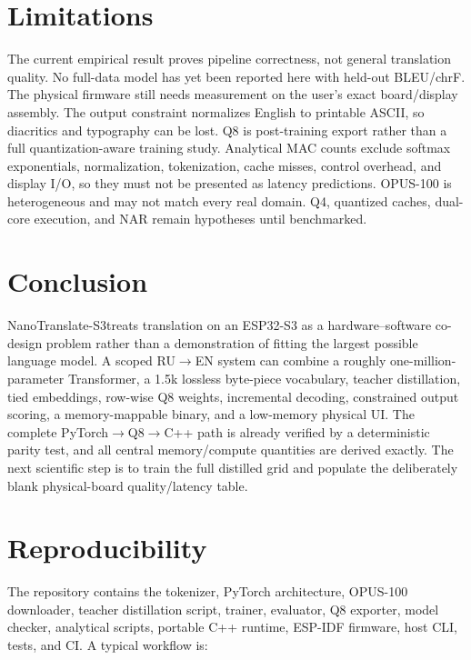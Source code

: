 \documentclass{article}
\newcommand{\modelname}{NanoTranslate-S3}
\begin{document}
\section{Limitations}
The current empirical result proves pipeline correctness, not general translation quality. No full-data model has yet been reported here with held-out BLEU/chrF. The physical firmware still needs measurement on the user's exact board/display assembly. The output constraint normalizes English to printable ASCII, so diacritics and typography can be lost. Q8 is post-training export rather than a full quantization-aware training study. Analytical MAC counts exclude softmax exponentials, normalization, tokenization, cache misses, control overhead, and display I/O, so they must not be presented as latency predictions. OPUS-100 is heterogeneous and may not match every real domain. Q4, quantized caches, dual-core execution, and NAR remain hypotheses until benchmarked.

\section{Conclusion}
\modelname treats translation on an ESP32-S3 as a hardware--software co-design problem rather than a demonstration of fitting the largest possible language model. A scoped RU$\rightarrow$EN system can combine a roughly one-million-parameter Transformer, a 1.5k lossless byte-piece vocabulary, teacher distillation, tied embeddings, row-wise Q8 weights, incremental decoding, constrained output scoring, a memory-mappable binary, and a low-memory physical UI. The complete PyTorch$\rightarrow$Q8$\rightarrow$C++ path is already verified by a deterministic parity test, and all central memory/compute quantities are derived exactly. The next scientific step is to train the full distilled grid and populate the deliberately blank physical-board quality/latency table.

\section*{Reproducibility}
The repository contains the tokenizer, PyTorch architecture, OPUS-100 downloader, teacher distillation script, trainer, evaluator, Q8 exporter, model checker, analytical scripts, portable C++ runtime, ESP-IDF firmware, host CLI, tests, and CI. A typical workflow is:
\end{document}

